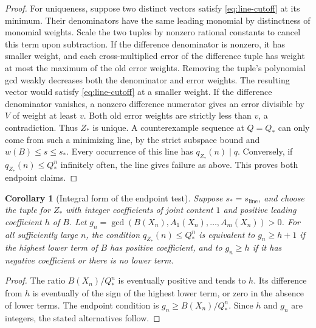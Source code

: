 \documentclass[11pt,a4paper,reqno]{amsart}
\newtheorem{corollary}[theorem]{Corollary}
\theoremstyle{definition}
\theoremstyle{remark}
\numberwithin{equation}{section}
\begin{document}
\begin{proof}
For uniqueness, suppose two distinct vectors satisfy
\eqref{eq:line-cutoff} at its minimum. Their denominators have
the same leading monomial by distinctness of monomial weights.
Scale the two tuples by nonzero rational constants to cancel this
term upon subtraction. If the difference denominator is nonzero,
it has smaller weight, and each cross-multiplied error of the
difference tuple has weight at most the maximum of the old error
weights. Removing the tuple's polynomial gcd weakly decreases
both the denominator and error weights. The resulting vector
would satisfy \eqref{eq:line-cutoff} at a smaller weight.
If the difference denominator vanishes, a nonzero difference
numerator gives an error divisible by \(V\) of weight at least
\(v\). Both old error weights are strictly less than \(v\),
a contradiction. Thus \(Z_*\) is unique. A counterexample
sequence at \(Q=Q_*\) can only come from such a minimizing
line, by the strict subspace bound and \(w(B)\le s\le s_*\).
Every occurrence of this line has \(q_{Z_*}(n)\mid q\).
Conversely, if \(q_{Z_*}(n)\le Q_*^n\) infinitely often, the
line gives failure as above. This proves both endpoint claims.
\end{proof}

\begin{corollary}[Integral form of the endpoint test]\label{cor:cutoff-gcd}
Suppose \(s_*=s_{\mathrm{line}}\), and choose the tuple for \(Z_*\)
with integer coefficients of joint content \(1\) and positive leading
coefficient \(h\) of \(B\). Let
\(g_n=\gcd(B(X_n),A_1(X_n),\ldots,A_m(X_n))>0\).
For all sufficiently large \(n\), the condition
\(q_{Z_*}(n)\le Q_*^n\) is equivalent to \(g_n\ge h+1\) if the
highest lower term of \(B\) has positive coefficient, and to
\(g_n\ge h\) if it has negative coefficient or there is no lower term.
\end{corollary}

\begin{proof}
The ratio \(B(X_n)/Q_*^n\) is eventually positive and tends to \(h\).
Its difference from \(h\) is eventually of the sign of the highest
lower term, or zero in the absence of lower terms.
The endpoint condition is \(g_n\ge B(X_n)/Q_*^n\).
Since \(h\) and \(g_n\) are integers, the stated alternatives follow.
\end{proof}
\end{document}

